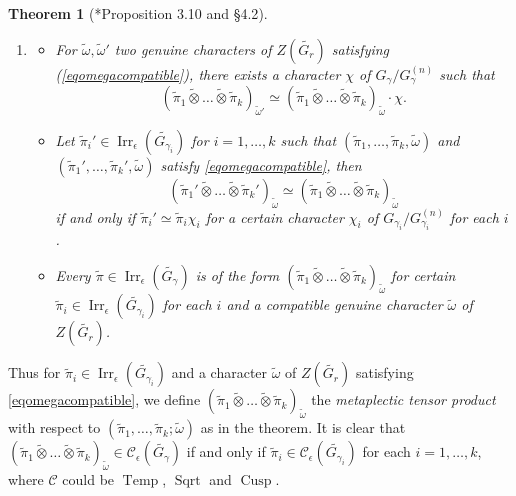 \documentclass{amsart}
\numberwithin{equation}{section}
\newtheorem{theorem}{\bf{Theorem}}[section]
\newcommand{\mrirr}{\operatorname{Irr}}
\newcommand{\mrcusp}{\operatorname{Cusp}}
\newcommand{\mrsqrt}{\operatorname{Sqrt}}
\newcommand{\mrtemp}{\operatorname{Temp}}
\newcommand{\mcc}{\mathcal{C}}
\newcommand{\wt}[1]{\widetilde{#1}}
\begin{document}
\begin{theorem}[\cite{kaplan2022classification}*{Proposition 3.10 and \S 4.2}]
\begin{enumerate}
			\item \begin{itemize}
				\item For $\wt{\omega}, \wt{\omega}'$ two genuine characters of $Z(\wt{G_{r}})$ satisfying (\ref{eqomegacompatible}), there exists a character $\chi$ of $G_{\gamma}/G_{\gamma}^{(n)}$ such that $$(\wt{\pi}_{1}\wt{\otimes}\dots\wt{\otimes}\wt{\pi}_{k})_{\wt{\omega}'}\simeq (\wt{\pi}_{1}\wt{\otimes}\dots\wt{\otimes}\wt{\pi}_{k})_{\wt{\omega}}\cdot\chi.$$
				
				\item Let $\wt{\pi}_{i}'\in\mrirr_{\epsilon}(\wt{G_{\gamma_{i}}})$ for $i=1,\dots,k$ such that $(\wt{\pi}_{1},\dots,\wt{\pi}_{k},\wt{\omega})$ and $(\wt{\pi}_{1}',\dots,\wt{\pi}_{k}',\wt{\omega})$ satisfy \eqref{eqomegacompatible}, then
				$$(\wt{\pi}_{1}'\wt{\otimes}\dots\wt{\otimes}\wt{\pi}_{k}')_{\wt{\omega}}\simeq (\wt{\pi}_{1}\wt{\otimes}\dots\wt{\otimes}\wt{\pi}_{k})_{\wt{\omega}}$$
				if and only if
				$\wt{\pi}_{i}'\simeq\wt{\pi}_{i}\chi_{i}$ for a certain character $\chi_{i}$ of $G_{\gamma_{i}}/G_{\gamma_{i}}^{(n)}$ for each $i$.
				\item Every $\wt{\pi}\in\mrirr_{\epsilon}(\wt{G_{\gamma}})$ is of the form $(\wt{\pi}_{1}\wt{\otimes}\dots\wt{\otimes}\wt{\pi}_{k})_{\wt{\omega}}$ for certain $\wt{\pi}_{i}\in\mrirr_{\epsilon}(\wt{G_{\gamma_{i}}})$ for each $i$ and a compatible genuine character $\wt{\omega}$ of $Z(\wt{G_{r}})$.
			\end{itemize}
			
		\end{enumerate}
		
	\end{theorem}
	
	Thus for $\wt{\pi}_{i}\in\mrirr_{\epsilon}(\wt{G_{\gamma_{i}}})$ and a character $\wt{\omega}$ of $Z(\wt{G_{r}})$ satisfying \eqref{eqomegacompatible}, we define $(\wt{\pi}_{1}\wt{\otimes}\dots\wt{\otimes}\wt{\pi}_{k})_{\wt{\omega}}$ the \emph{metaplectic tensor product} with respect to $(\wt{\pi}_{1},\dots,\wt{\pi}_{k};\wt{\omega})$ as in the theorem. It is clear that $(\wt{\pi}_{1}\wt{\otimes}\dots\wt{\otimes}\wt{\pi}_{k})_{\wt{\omega}}\in\mcc_{\epsilon}(\wt{G_{\gamma}})$ if and only if $\wt{\pi}_{i}\in\mcc_{\epsilon}(\wt{G_{\gamma_{i}}})$ for each $i=1,\dots,k$, where $\mcc$ could be $\mrtemp$, $\mrsqrt$ and $\mrcusp$.
	
\end{document}

